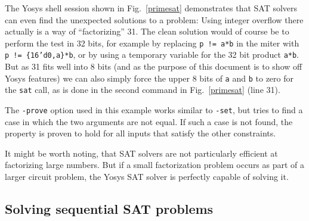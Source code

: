 \documentclass[9pt,technote,a4paper]{IEEEtran}
\begin{document}
The Yosys shell session shown in Fig.~\ref{primesat} demonstrates that SAT
solvers can even find the unexpected solutions to a problem: Using integer
overflow there actually is a way of ``factorizing'' 31. The clean solution
would of course be to perform the test in 32 bits, for example by replacing
{\tt p != a*b} in the miter with {\tt p != \{16'd0,a\}*b}, or by using a
temporary variable for the 32 bit product {\tt a*b}. But as 31 fits well into
8 bits (and as the purpose of this document is to show off Yosys features)
we can also simply force the upper 8 bits of {\tt a} and {\tt b} to zero for
the {\tt sat} call, as is done in the second command in Fig.~\ref{primesat}
(line 31).

The {\tt -prove} option used in this example works similar to {\tt -set}, but
tries to find a case in which the two arguments are not equal. If such a case is
not found, the property is proven to hold for all inputs that satisfy the other
constraints.

It might be worth noting, that SAT solvers are not particularly efficient at
factorizing large numbers. But if a small factorization problem occurs as
part of a larger circuit problem, the Yosys SAT solver is perfectly capable
of solving it.

\subsection{Solving sequential SAT problems}
\end{document}

